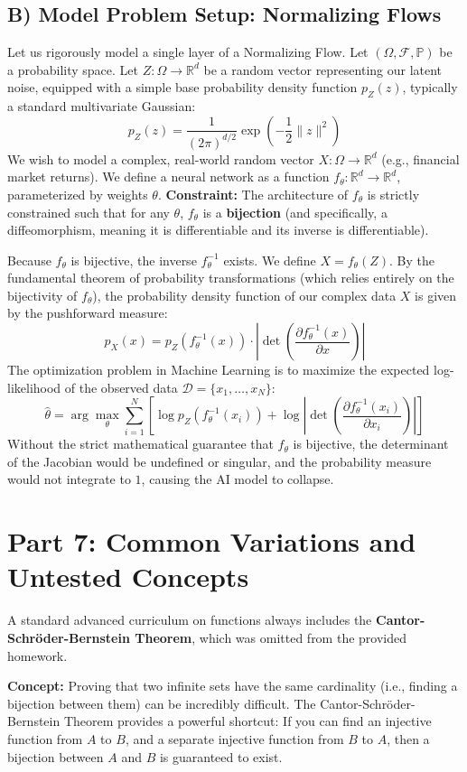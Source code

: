 \documentclass[11pt, a4paper]{article}
\theoremstyle{definition}
\theoremstyle{remark}
\newcommand{\R}{\mathbb{R}}
\newcommand{\Prob}{\mathbb{P}}
\newcommand{\F}{\mathcal{F}}
\begin{document}
\subsection{B) Model Problem Setup: Normalizing Flows}
Let us rigorously model a single layer of a Normalizing Flow. 
Let $(\Omega, \F, \Prob)$ be a probability space. Let $Z: \Omega \to \R^d$ be a random vector representing our latent noise, equipped with a simple base probability density function $p_Z(z)$, typically a standard multivariate Gaussian:
\[ p_Z(z) = \frac{1}{(2\pi)^{d/2}} \exp\left(-\frac{1}{2} \|z\|^2\right) \]
We wish to model a complex, real-world random vector $X: \Omega \to \R^d$ (e.g., financial market returns). 
We define a neural network as a function $f_\theta: \R^d \to \R^d$, parameterized by weights $\theta$. 
\textbf{Constraint:} The architecture of $f_\theta$ is strictly constrained such that for any $\theta$, $f_\theta$ is a \textbf{bijection} (and specifically, a diffeomorphism, meaning it is differentiable and its inverse is differentiable).

Because $f_\theta$ is bijective, the inverse $f_\theta^{-1}$ exists. We define $X = f_\theta(Z)$. 
By the fundamental theorem of probability transformations (which relies entirely on the bijectivity of $f_\theta$), the probability density function of our complex data $X$ is given by the pushforward measure:
\[ p_X(x) = p_Z(f_\theta^{-1}(x)) \cdot \left| \det \left( \frac{\partial f_\theta^{-1}(x)}{\partial x} \right) \right| \]
The optimization problem in Machine Learning is to maximize the expected log-likelihood of the observed data $\mathcal{D} = \{x_1, \dots, x_N\}$:
\[ \hat{\theta} = \arg\max_\theta \sum_{i=1}^N \left[ \log p_Z(f_\theta^{-1}(x_i)) + \log \left| \det \left( \frac{\partial f_\theta^{-1}(x_i)}{\partial x_i} \right) \right| \right] \]
Without the strict mathematical guarantee that $f_\theta$ is bijective, the determinant of the Jacobian would be undefined or singular, and the probability measure would not integrate to $1$, causing the AI model to collapse.

\newpage
\section{Part 7: Common Variations and Untested Concepts}

A standard advanced curriculum on functions always includes the \textbf{Cantor-Schröder-Bernstein Theorem}, which was omitted from the provided homework.

\textbf{Concept:} Proving that two infinite sets have the same cardinality (i.e., finding a bijection between them) can be incredibly difficult. The Cantor-Schröder-Bernstein Theorem provides a powerful shortcut: If you can find an injective function from $A$ to $B$, and a separate injective function from $B$ to $A$, then a bijection between $A$ and $B$ is guaranteed to exist.
\end{document}
